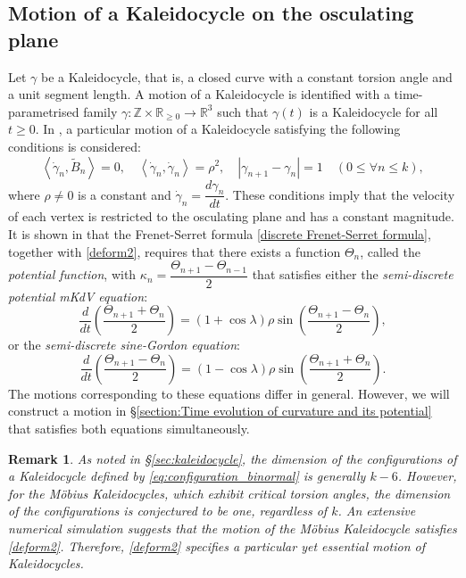 \documentclass[10pt,leqno]{amsart}
\newcommand{\Z}{\mathbb{Z}}
\newcommand{\R}{\mathbb{R}}
\newtheorem{remark}[theorem]{Remark}
\numberwithin{equation}{section}
\begin{document}
\subsection{Motion of a Kaleidocycle on the osculating plane}\label{subsection:Segment-length and torsion-angle preserving deformation of discrete space curve}
Let $\gamma$ be a Kaleidocycle, that is, a closed curve with a constant torsion angle and a unit segment length.
A motion of a Kaleidocycle is identified with a time-parametrised family 
$\gamma: \Z \times \R_{\ge 0}\to \R^3$ such that 
$\gamma(t)$ is a Kaleidocycle for all $t\ge 0$.
In \cite{KKP:linkage}, a particular motion of a Kaleidocycle 
satisfying the following conditions is considered:
\begin{equation}\label{deform2}
\left\langle\dot{\gamma}_{n}, \widetilde{B}_{n}\right\rangle=0,\quad\left\langle\dot{\gamma}_{n}, \dot{\gamma}_{n}\right\rangle=\rho^2, 
\quad
|{\gamma}_{n+1}-{\gamma}_{n}|=1 \quad (0\le \forall n \le k),
\end{equation}
where $\rho\neq 0$ is a constant and 
$\dot{\gamma}_{n}=\dfrac{d\gamma_n}{dt}$.
These conditions imply that the velocity of each vertex is restricted to the osculating plane and has a constant magnitude.
It is shown in \cite{KKP:linkage} that the Frenet-Serret formula \eqref{discrete Frenet-Serret formula}, together with 
\eqref{deform2}, requires that there exists a function 
$\Theta_n$, called the \emph{potential function}, with $\kappa_n=\dfrac{\Theta_{n+1}-\Theta_{n-1}}{2}$ that satisfies either 
the \emph{semi-discrete potential mKdV equation}:
\begin{equation}\label{semi-discrete potential mKdV}
\frac{d}{dt}\left(\frac{\Theta_{n+1}+\Theta_{n}}{2}\right)=\left(1+\cos\lambda\right)\rho\sin\left(\frac{\Theta_{n+1}-\Theta_{n}}{2}\right),
\end{equation}
or the \emph{semi-discrete sine-Gordon equation}:
\begin{equation}\label{semi-discrete sG}
\frac{d}{dt}\left(\frac{\Theta_{n+1}-\Theta_{n}}{2}\right)=\left(1-\cos\lambda\right)\rho\sin\left(\frac{\Theta_{n+1}+\Theta_{n}}{2}\right).
\end{equation}
The motions corresponding to these equations differ in general. However, we will construct a motion in \S \ref{section:Time evolution of curvature and its potential} that satisfies both equations simultaneously.

\begin{remark}
As noted in \S \ref{sec:kaleidocycle}, the dimension of the configurations of a Kaleidocycle defined by 
\eqref{eq:configuration_binormal} is generally $k-6$. 
However, for the M\"obius Kaleidocycles, which exhibit critical torsion angles,
the dimension of the configurations is conjectured to be one, regardless of $k$.
An extensive numerical simulation suggests that the motion of 
the M\"obius Kaleidocycle satisfies \eqref{deform2}. 
Therefore, \eqref{deform2} specifies a particular yet essential motion of Kaleidocycles.
\end{remark}
\end{document}
